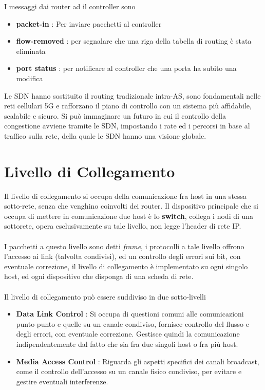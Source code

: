 \documentclass[12pt, letterpaper]{article}
\newcommand{\acc}{\\\hphantom{}\\}
\begin{document}
I messaggi dai router ad il controller sono\begin{itemize}
    \item \textbf{packet-in} : Per inviare pacchetti al controller 
    \item \textbf{flow-removed} : per segnalare che una riga della tabella di routing è stata eliminata 
    \item \textbf{port status} : per notificare al controller che una porta ha subito una modifica 
\end{itemize}
Le SDN hanno sostituito il routing tradizionale intra-AS, sono fondamentali nelle reti cellulari 5G e rafforzano il 
piano di controllo con un sistema più affidabile, scalabile e sicuro. Si può immaginare un futuro in cui il controllo 
della congestione avviene tramite le SDN, impostando i rate ed i percorsi in base al traffico sulla rete, della quale 
le SDN hanno una visione globale.
\section{Livello di Collegamento}
Il livello di collegamento si occupa della comunicazione fra host in una stessa sotto-rete, senza che venghino 
coinvolti dei router. Il dispositivo principale che si occupa di mettere in comunicazione due host 
è lo \textbf{switch}, collega i nodi di una sottorete, opera esclusivamente su tale livello, non legge 
l'header di rete IP.\acc 
I pacchetti a questo livello sono detti \textit{frame}, i protocolli a tale livello offrono l'accesso ai 
link (talvolta condivisi), ed un controllo degli errori sui bit, con eventuale correzione, il livello di collegamento è 
implementato su ogni singolo host, ed ogni dispositivo che disponga di una scheda di rete.\acc 
Il livello di collegamento può essere suddiviso in due sotto-livelli\begin{itemize}
    \item \textbf{Data Link Control} : Si occupa di questioni comuni alle comunicazioni punto-punto e quelle 
    su un canale condiviso, fornisce controllo del flusso e degli errori, con eventuale correzione. Gestisce quindi 
    la comunicazione indipendentemente dal fatto che sia fra due singoli host o fra più host. 
    \item \textbf{Media Access Control} : Riguarda gli aspetti specifici dei canali broadcast, come il controllo 
    dell'accesso su un canale fisico condiviso, per evitare e gestire eventuali interferenze.
\end{itemize}
\end{document}
